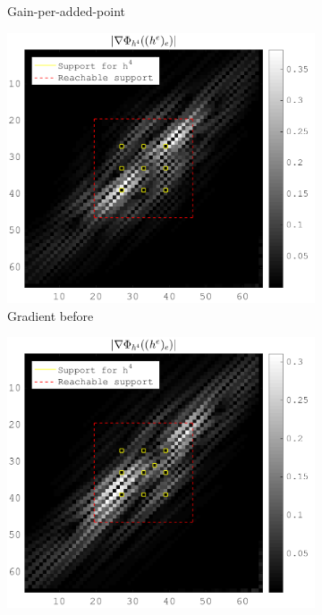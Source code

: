 \begin{figure}[!ht]
\begin{subfigure}[b]{0.32\textwidth}
\caption{Gain-per-added-point} \label{fig_gain_matrix}
\end{subfigure}
\begin{subfigure}[b]{0.32\textwidth}\centering
\includegraphics[width=\textwidth]{figures/before_after/xp_128x128_sc2_angl1_K3_S3_node4before_partgrad4.png}
\caption{Gradient before} \label{fig_grad_before}
\end{subfigure}
\begin{subfigure}[b]{0.32\textwidth}\centering
\includegraphics[width=\textwidth]{figures/before_after/xp_128x128_sc2_angl1_K3_S3_node4after_partgrad4.png}

\end{subfigure}
\end{figure}
